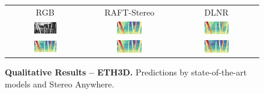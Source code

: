 \documentclass[10pt,twocolumn,letterpaper]{article}
\newcommand{\method}[0]{Stereo Anywhere\xspace}
\begin{document}
\begin{figure}[h]
\begin{tabular}{ccc}
        \small RGB &
        \small RAFT-Stereo \cite{lipson2021raft} &
        \small DLNR \cite{zhao2023high} \\
        \includegraphics[width=0.31\textwidth]{imgs/ETH3D/rgb/19.jpg} &
        \includegraphics[width=0.31\textwidth]{imgs/ETH3D/stereo/RAFT-Stereo/19.jpg} &
        \includegraphics[width=0.31\textwidth]{imgs/ETH3D/stereo/DLNR/19.jpg} \\
        \includegraphics[width=0.31\textwidth]{imgs/ETH3D/stereo/NMRF/19.jpg} &
        \includegraphics[width=0.31\textwidth]{imgs/ETH3D/stereo/Selective/19.jpg} &
        \includegraphics[width=0.31\textwidth]{imgs/ETH3D/stereo/Ours/19.jpg} \\
    \end{tabular}\vspace{-0.3cm}
    \caption{\textbf{Qualitative Results -- ETH3D.} Predictions by state-of-the-art models and \method.}
    \label{fig:qual_eth3d}\vspace{-0.3cm}
\end{figure}
\end{document}
